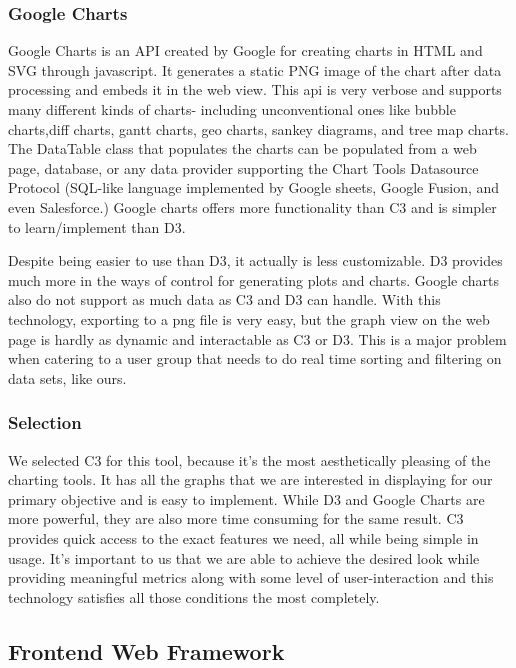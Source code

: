 \subsubsection{Google Charts}
Google Charts is an API created by Google for creating charts in HTML and SVG through javascript. 
It generates a static PNG image of the chart after data processing and embeds it in the web view. 
This api is very verbose and supports many different kinds of charts- including unconventional ones like bubble charts,diff charts, gantt charts, geo charts, sankey diagrams, and tree map charts. 
The DataTable class that populates the charts can be populated from a web page, database, or any data provider supporting the Chart Tools Datasource Protocol (SQL-like language implemented by Google sheets, Google Fusion, and even Salesforce.) Google charts offers more functionality than C3 and is simpler to learn/implement than D3. 

Despite being easier to use than D3, it actually is less customizable. 
D3 provides much more in the ways of control for generating plots and charts. 
Google charts also do not support as much data as C3 and D3 can handle. 
With this technology, exporting to a png file is very easy, but the graph view on the web page is hardly as dynamic and interactable as C3 or D3. 
This is a major problem when catering to a user group that needs to do real time sorting and filtering on data sets, like ours. 

\subsubsection{Selection}
We selected C3 for this tool, because it’s the most aesthetically pleasing of the charting tools. 
It has all the graphs that we are interested in displaying for our primary objective and is easy to implement. 
While D3 and Google Charts are more powerful, they are also more time consuming for the same result. 
C3 provides quick access to the exact features we need, all while being simple in usage. 
It’s important to us that we are able to achieve the desired look while providing meaningful metrics along with some level of user-interaction and this technology satisfies all those conditions the most completely. 


\subsection{Frontend Web Framework}

